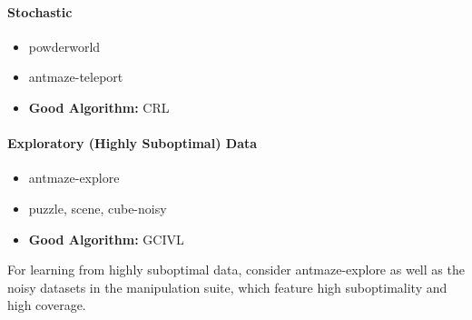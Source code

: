 \documentclass{article}
\theoremstyle{plain}
\theoremstyle{definition}
\theoremstyle{remark}
\begin{document}
\paragraph{Stochastic}
\begin{itemize}
    \item powderworld
    \item antmaze-teleport
    \item \textbf{Good Algorithm:} CRL
\end{itemize}

\paragraph{Exploratory (Highly Suboptimal) Data}
\begin{itemize}
    \item antmaze-explore
    \item {puzzle, scene, cube}-noisy
    \item \textbf{Good Algorithm:} GCIVL
\end{itemize}
For learning from highly suboptimal data, consider antmaze-explore as well as the noisy datasets in the manipulation suite, which feature high suboptimality and high coverage.
\end{document}
